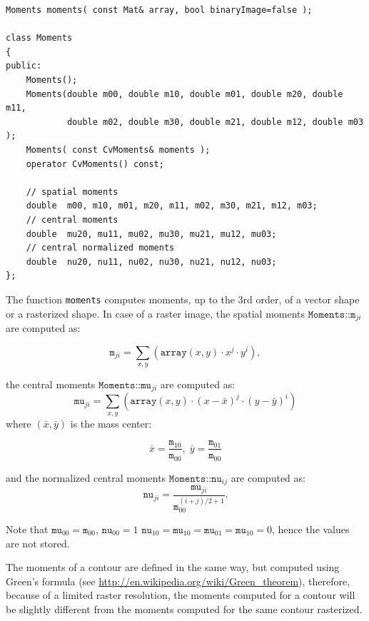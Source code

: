 \begin{lstlisting}
Moments moments( const Mat& array, bool binaryImage=false );

class Moments
{
public:
    Moments();
    Moments(double m00, double m10, double m01, double m20, double m11,
            double m02, double m30, double m21, double m12, double m03 );
    Moments( const CvMoments& moments );
    operator CvMoments() const;
    
    // spatial moments
    double  m00, m10, m01, m20, m11, m02, m30, m21, m12, m03;
    // central moments
    double  mu20, mu11, mu02, mu30, mu21, mu12, mu03;
    // central normalized moments
    double  nu20, nu11, nu02, nu30, nu21, nu12, nu03;
};
\end{lstlisting}
\begin{description}
\end{description}

The function \texttt{moments} computes moments, up to the 3rd order, of a vector shape or a rasterized shape.
In case of a raster image, the spatial moments $\texttt{Moments::m}_{ji}$ are computed as:

\[\texttt{m}_{ji}=\sum_{x,y} \left(\texttt{array}(x,y) \cdot x^j \cdot y^i\right),\]

the central moments $\texttt{Moments::mu}_{ji}$ are computed as:
\[\texttt{mu}_{ji}=\sum_{x,y} \left(\texttt{array}(x,y) \cdot (x - \bar{x})^j \cdot (y - \bar{y})^i\right)\]
where $(\bar{x}, \bar{y})$ is the mass center:

\[
\bar{x}=\frac{\texttt{m}_{10}}{\texttt{m}_{00}},\; \bar{y}=\frac{\texttt{m}_{01}}{\texttt{m}_{00}}
\]

and the normalized central moments $\texttt{Moments::nu}_{ij}$ are computed as:
\[\texttt{nu}_{ji}=\frac{\texttt{mu}_{ji}}{\texttt{m}_{00}^{(i+j)/2+1}}.\]

Note that $\texttt{mu}_{00}=\texttt{m}_{00}$, $\texttt{nu}_{00}=1$ $\texttt{nu}_{10}=\texttt{mu}_{10}=\texttt{mu}_{01}=\texttt{mu}_{10}=0$, hence the values are not stored.

The moments of a contour are defined in the same way, but computed using Green's formula
(see \url{http://en.wikipedia.org/wiki/Green_theorem}), therefore, because of a limited raster resolution, the moments computed for a contour will be slightly different from the moments computed for the same contour rasterized.

